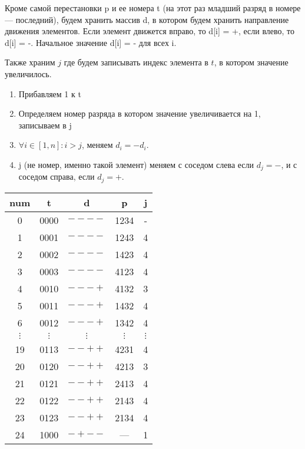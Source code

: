\begin{algoritm}
    
    Кроме самой перестановки p и ее номера t (на этот раз младший разряд в номере --- последний), будем хранить массив d, в котором будем хранить направление движения элементов. Если элемент движется вправо, то d[i] = +, если влево, то d[i] = -. Начальное значение d[i] = - для всех i.

    Также храним $j$ где будем записывать индекс элемента в $t$, в котором значение увеличилось.

    \begin{enumerate}
        \item Прибавляем 1 к t
        \item Определяем номер разряда в котором значение увеличивается на 1, записываем в j
        \item $\forall i \in [1,n]: i > j$, меняем $d_i = -d_i$.
        \item j (не номер, именно такой элемент) меняем с соседом слева если $d_j=-$, и с соседом справа, если $d_j = +$.
    \end{enumerate}

\end{algoritm}

\begin{eg}
    \begin{tabular}{|c|c|c|c|c|}
        \hline
        num & t & d & p & j \\
        \hline
        0 & 0000 & $----$ & 1234 & - \\
        1 & 0001 & $----$ & 1243 & 4 \\
        2 & 0002 & $----$ & 1423 & 4 \\
        3 & 0003 & $----$ & 4123 & 4 \\
        4 & 0010 & $---+$ & 4132 & 3 \\
        5 & 0011 & $---+$ & 1432 & 4 \\
        6 & 0012 & $---+$ & 1342 & 4 \\
        $\vdots$ &$\vdots$ & $\vdots$ & $\vdots$ & $\vdots$ \\
        
        19 &0113& $--++$& 4231 & 4 \\
        20 &0120& $--++$& 4213 & 3 \\
        21 &0121& $--++$& 2413 & 4 \\
        22 &0122& $--++$& 2143 & 4 \\
        23 &0123& $--++$& 2134 & 4 \\
        24 &1000& $-+--$& --- & 1 \\
        \hline
        
        
        
    \end{tabular}
\end{eg}
